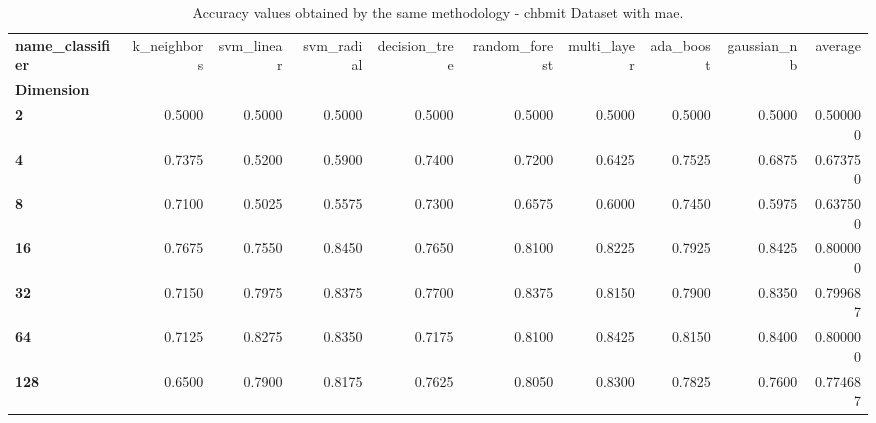\begin{table}
\centering
\caption{Accuracy values obtained by the same methodology - chbmit Dataset with mae.}
\label{accuracy_chbmit_mae-reproduction}
\begin{tabular}{lrrrrrrrrr}
\toprule
\textbf{name\_classifier} &  k\_neighbors &  svm\_linear &  svm\_radial &  decision\_tree &  random\_forest &  multi\_layer &  ada\_boost &  gaussian\_nb &   average \\
\textbf{Dimension} &              &             &             &                &                &              &            &              &           \\
\midrule
\textbf{2        } &       0.5000 &      0.5000 &      0.5000 &         0.5000 &         0.5000 &       0.5000 &     0.5000 &       0.5000 &  0.500000 \\
\textbf{4        } &       0.7375 &      0.5200 &      0.5900 &         0.7400 &         0.7200 &       0.6425 &     0.7525 &       0.6875 &  0.673750 \\
\textbf{8        } &       0.7100 &      0.5025 &      0.5575 &         0.7300 &         0.6575 &       0.6000 &     0.7450 &       0.5975 &  0.637500 \\
\textbf{16       } &       0.7675 &      0.7550 &      0.8450 &         0.7650 &         0.8100 &       0.8225 &     0.7925 &       0.8425 &  0.800000 \\
\textbf{32       } &       0.7150 &      0.7975 &      0.8375 &         0.7700 &         0.8375 &       0.8150 &     0.7900 &       0.8350 &  0.799687 \\
\textbf{64       } &       0.7125 &      0.8275 &      0.8350 &         0.7175 &         0.8100 &       0.8425 &     0.8150 &       0.8400 &  0.800000 \\
\textbf{128      } &       0.6500 &      0.7900 &      0.8175 &         0.7625 &         0.8050 &       0.8300 &     0.7825 &       0.7600 &  0.774687 \\
\bottomrule
\end{tabular}
\end{table}
